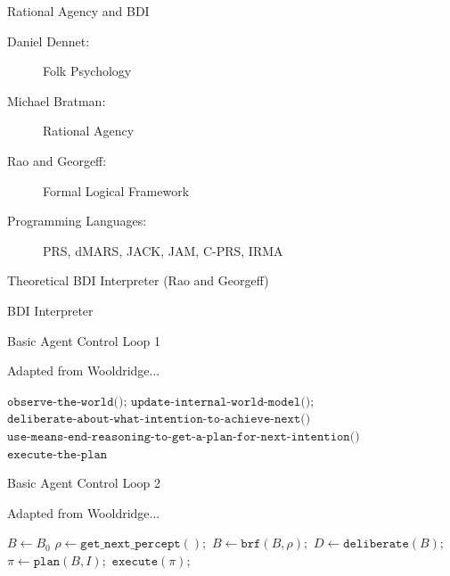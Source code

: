 \documentclass[aspectratio=1610,xcolor=dvipsnames,t]{beamer}
\newcommand{\showcode}[1]{\begin{mdframed}[style=code] %
                          \end{mdframed}%
}
\begin{document}
\begin{frame}{Rational Agency and BDI} 
    \begin{description}
        \item[Daniel Dennet:] Folk Psychology
        \item[Michael Bratman:] Rational Agency
        \item[Rao and Georgeff:] Formal Logical Framework
        \item[Programming Languages:] PRS, dMARS, JACK, JAM, C-PRS, IRMA
    \end{description} 
\end{frame} 

\begin{frame}{Theoretical BDI Interpreter (Rao and Georgeff)} 
    \begin{block}{BDI Interpreter} 
        \showcode{raogeorgeff.py} 
    \end{block} 
\end{frame} 

\begin{frame}{Basic Agent Control Loop 1}
    \begin{block}{Adapted from Wooldridge...}
        \begin{algorithmic}[0]
                    \State $\texttt{observe-the-world();}$ 
                    \State $\texttt{update-internal-world-model();}$
                    \State $\texttt{deliberate-about-what-intention-to-achieve-next()}$
                    \State $\texttt{use-means-end-reasoning-to-get-a-plan-for-next-intention()}$
                    \State $\texttt{execute-the-plan}$
                \EndWhile
            \EndProcedure
        \end{algorithmic} 
    \end{block} 
\end{frame} 

\begin{frame}{Basic Agent Control Loop 2} 
    \begin{block}{Adapted from Wooldridge...} 
        \begin{algorithmic}[0] 
                \State $B \gets B_0$
                    \State $\rho \gets \texttt{get\_next\_percept}();$
                    \State $B \gets \texttt{brf}(B, \rho);$
                    \State $D \gets \texttt{deliberate}(B);$ 
                    \State $\pi \gets \texttt{plan}(B, I); $
                    \State $\texttt{execute}(\pi); $
                \EndWhile
            \EndProcedure
        \end{algorithmic} 
    \end{block} 
\end{frame} 
\end{document}
